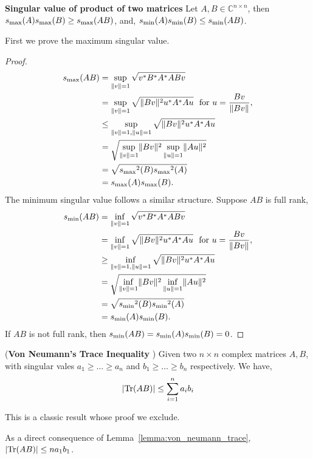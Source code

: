 \begin{lemma}
\textbf{Singular value of product of two matrices}\label{lemma:sigma_prod_lemma}
Let $A, B \in \mathbb{C}^{n \times n}$, then
${s_{\max}}(A){s_{\max}}(B) \ge {s_{\max}}(AB)$, and, ${s_{\min}}(A){s_{\min}}(B) \le {s_{\min}}(AB)$.
\end{lemma}
First we prove the maximum singular value.
\begin{proof}
\begin{align}
{s_{\max}}(AB) &= \sup_{\lVert v \rVert = 1} \sqrt{v^* B^* A^* A B v} \\
&= \sup_{\lVert v \rVert = 1} \sqrt{\lVert Bv \rVert^2 u^* A^* A u} \ \ \text{for } u = \frac{Bv}{\lVert Bv \rVert}, \\
&\le \sup_{\lVert v \rVert = 1, \lVert u \rVert = 1} \sqrt{\lVert Bv \rVert^2 u^* A^* A u}\\
&= \sqrt{\sup_{\lVert v \rVert = 1}  \lVert Bv \rVert^2 \sup_{\lVert u \rVert = 1} \lVert Au \rVert^2}\\
&= \sqrt{{s_{\max}}^2(B) {s_{\max}}^2(A)}\\
&= {s_{\max}}(A){s_{\max}}(B).
\end{align}
The minimum singular value follows a similar structure. Suppose $AB$ is full rank,
\begin{align}
{s_{\min}}(AB) &= \inf_{\lVert v \rVert = 1} \sqrt{v^* B^* A^* A B v} \\
&= \inf_{\lVert v \rVert = 1} \sqrt{\lVert Bv \rVert^2 u^* A^* A u} \ \ \text{for } u = \frac{Bv}{\lVert Bv \rVert}, \\
&\ge \inf_{\lVert v \rVert = 1, \lVert u \rVert = 1} \sqrt{\lVert Bv \rVert^2 u^* A^* A u} \\
&= \sqrt{\inf_{\lVert v \rVert = 1}  \lVert Bv \rVert^2 \inf_{\lVert u \rVert = 1} \lVert Au \rVert^2}\\
&= \sqrt{{s_{\min}}^2(B) {s_{\min}}^2(A)}\\
&= {s_{\min}}(A){s_{\min}}(B).
\end{align}
If $AB$ is not full rank, then ${s_{\min}}(AB) = {s_{\min}}(A) {s_{\min}}(B) = 0$.
\end{proof}

\begin{lemma}(\textbf{Von Neumann's Trace Inequality} \citep{von1937some})\label{lemma:von_neumann_trace}
Given two $n\times n$ complex matrices $A,B$, with singular vales $a_1 \geq\ldots\geq a_n$ and $b_1\geq\ldots\geq b_n$ respectively. We have,
\[\left\vert \mathrm{Tr}(AB)\right\vert \leq \sum_{i=1}^{n} a_i b_i\]
\end{lemma}
This is a classic result whose proof we exclude.

As a direct consequence of Lemma~\ref{lemma:von_neumann_trace}, $\left\vert \mathrm{Tr}(AB)\right\vert \leq n a_1 b_1$.